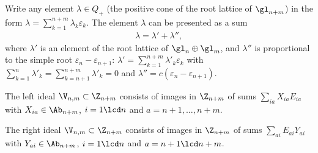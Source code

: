 Write any element $\lambda\in Q_+$ (the positive cone of the root lattice of $\gl_{n+m}$) in the form $\lambda=\sum_{k=1}^{n+m}\lambda_k\varepsilon_k$.
The element $\lambda$ can be presented as a sum
\begin{gather}\label{lalaplapp}\lambda= \lambda'+\lambda''  ,\end{gather}
where $\lambda'$ is an element of the root lattice of $\gl_n\oplus \gl_m$, and $\lambda''$ is
proportional to the simple root $\varepsilon_n-\varepsilon_{n+1}$: $\lambda'=\sum_{k=1}^{n+m}\lambda'_k\varepsilon_k$ with
$\sum_{k=1}^n\lambda'_k =  \sum_{k=n+1}^{n+m}\lambda'_k=0$ and $\lambda''=c(\varepsilon_n-\varepsilon_{n+1})$.

\begin{lem}\label{lemma1}%
The left ideal  $\V_{n,m}\subset\Z_{n+m}$ consists of images in $\Z_{n+m}$ of  sums
$\sum_{ia}X_{ia} E_{ia}$ with $X_{ia}\in\Ab_{n+m}$, $i=1\lcd n$ and $a=n+1,\dots, n+m$.


The right ideal   $\V_{n,m}\subset\Z_{n+m}$ consists of images in $\Z_{n+m}$ of  sums $\sum_{ai} E_{ai}Y_{ai}$ with $Y_{ai}\in\Ab_{n+m}$,
$i=1\lcd n $ and  $a=n+1
\lcd n+m$.\end{lem}

